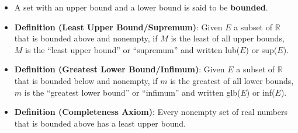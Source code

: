 \documentclass{article}
\theoremstyle{break}
\begin{document}
\begin{itemize}
\item A set with an upper bound and a lower bound is said to be
  \textbf{bounded}.

\item \textbf{Definition (Least Upper Bound/Supremum)}: Given $E$ a subset of
$\mathbb{R}$ that is bounded above and nonempty, if $M$ is the least of all
upper bounds, $M$ is the ``least upper bound'' or ``supremum'' and written
lub($E$) or sup($E$).

\item \textbf{Definition (Greatest Lower Bound/Infimum)}: Given $E$ a subset of
$\mathbb{R}$ that is bounded below and nonempty, if $m$ is the greatest of all
lower bounds, $m$ is the ``greatest lower bound'' or ``infimum'' and written
glb($E$) or inf($E$).

\item \textbf{Definition (Completeness Axiom)}: Every nonempty set of real
  numbers that is bounded above has a least upper bound.
\end{itemize}
\end{document}
